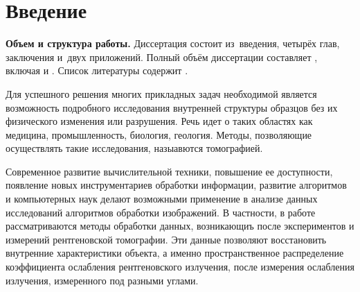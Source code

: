 \chapter*{Введение}							%

\newcommand{\actuality}{}
\newcommand{\progress}{}
\newcommand{\aim}{{\textbf\aimTXT}}
\newcommand{\tasks}{\textbf{\tasksTXT}}
\newcommand{\novelty}{\textbf{\noveltyTXT}}
\newcommand{\influence}{\textbf{\influenceTXT}}
\newcommand{\methods}{\textbf{\methodsTXT}}
\newcommand{\defpositions}{\textbf{\defpositionsTXT}}
\newcommand{\reliability}{\textbf{\reliabilityTXT}}
\newcommand{\probation}{\textbf{\probationTXT}}
\newcommand{\contribution}{\textbf{\contributionTXT}}
\newcommand{\publications}{\textbf{\publicationsTXT}}


\textbf{Объем и структура работы.} Диссертация состоит из~введения, четырёх глав, заключения и~двух приложений.
%
Полный объём диссертации составляет
, включая
 и
.   Список литературы содержит  
.

\actuality



Для успешного решения многих прикладных задач необходимой является возможность подробного исследования внутренней структуры образцов без их физического изменения или разрушения.
Речь идет о таких областях как медицина, промышленность, биология, геология. 
Методы, позволяющие осуществлять такие исследования, назыавются томографией.

Современное развитие вычислительной техники, повышение ее доступности, появление новых инструментариев обработки информации, развитие алгоритмов и компьютерных наук делают возможными применение в анализе данных исследований алгоритмов обработки изображений.
В частности, в работе рассматриваются методы обработки данных, возникающиъ после экспериментов и измерений рентгеновской томографии.
Эти данные позволяют восстановить внутренние характеристики объекта, а именно пространственное распределение коэффициента ослабления рентгеновского излучения, после измерения ослабления излучения, измеренного под разными углами.

